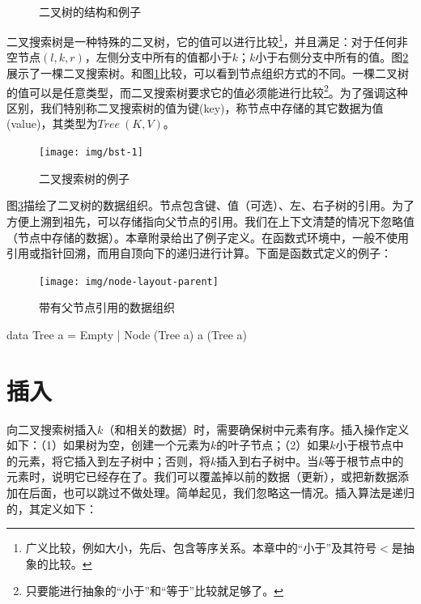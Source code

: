 \documentclass[b5paper]{ctexart}
\begin{document}
\begin{figure}[htbp]
  \centering
   \\
  \caption{二叉树的结构和例子}
  \label{fig:binary-tree-example}
\end{figure}

二叉搜索树是一种特殊的二叉树，它的值可以进行比较\footnote{广义比较，例如大小，先后、包含等序关系。本章中的“小于”及其符号$<$是抽象的比较。}，并且满足：对于任何非空节点$(l, k, r)$，左侧分支中所有的值都小于$k$；$k$小于右侧分支中所有的值。图\ref{fig:bst-example}展示了一棵二叉搜索树。和图\ref{fig:binary-tree-example}比较，可以看到节点组织方式的不同。一棵二叉树的值可以是任意类型，而二叉搜索树要求它的值必须能进行比较\footnote{只要能进行抽象的“小于”和“等于”比较就足够了。}。为了强调这种区别，我们特别称二叉搜索树的值为键(key)，称节点中存储的其它数据为值(value)，其类型为$Tree\ (K, V)$。

\begin{figure}[htbp]
  \centering
  \texttt{[image: img/bst-1]}
  \caption{二叉搜索树的例子} \label{fig:bst-example}
\end{figure}

图\ref{fig:node-layout-parent}描绘了二叉树的数据组织。节点包含键、值（可选）、左、右子树的引用。为了方便上溯到祖先，可以存储指向父节点的引用。我们在上下文清楚的情况下忽略值（节点中存储的数据）。本章附录给出了例子定义。在函数式环境中，一般不使用引用或指针回溯，而用自顶向下的递归进行计算。下面是函数式定义的例子：

\begin{figure}[htbp]
  \centering
  \texttt{[image: img/node-layout-parent]}
  \caption{带有父节点引用的数据组织} \label{fig:node-layout-parent}
\end{figure}

\begin{Haskell}
data Tree a = Empty | Node (Tree a) a (Tree a)
\end{Haskell}

\section{插入}

向二叉搜索树插入$k$（和相关的数据）时，需要确保树中元素有序。插入操作定义如下：（1）如果树为空，创建一个元素为$k$的叶子节点；（2）如果$k$小于根节点中的元素，将它插入到左子树中；否则，将$k$插入到右子树中。当$k$等于根节点中的元素时，说明它已经存在了。我们可以覆盖掉以前的数据（更新），或把新数据添加在后面，也可以跳过不做处理。简单起见，我们忽略这一情况。插入算法是递归的，其定义如下：
\end{document}
